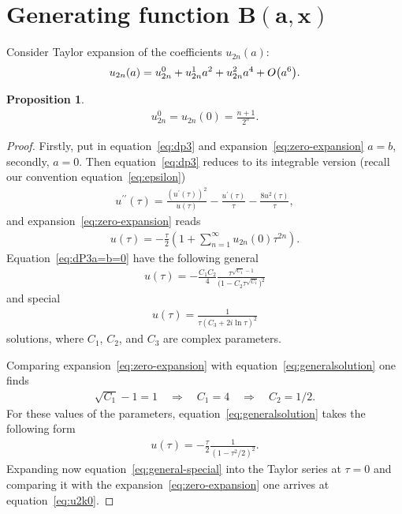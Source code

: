 \documentclass[pdftex]{sigma}
\numberwithin{equation}{section}
\newtheorem{Proposition}[Theorem]{Proposition}
 { \theoremstyle{definition}
\newtheorem{Remark}[Theorem]{Remark} }
\begin{document}
\section[Generating function $B(a,x)$]{Generating function $\boldsymbol{B(a,x)}$}\label{sec:generating-B}
Consider Taylor expansion of the coefficients $u_{2n}(a)$:
\begin{gather}\label{eq:u{2n}(a)-taylor}
u_{2n}(a)=u_{2n}^0+u_{2n}^1a^2+u_{2n}^2a^4+O\big(a^6\big).
\end{gather}
\begin{Proposition}\label{prop:u-at0}
\begin{gather}\label{eq:u2k0}
u_{2n}^0=u_{2n}(0)=\frac{n+1}{2^n}.
\end{gather}
\end{Proposition}
\begin{proof}
Firstly, put in equation~\eqref{eq:dp3} and expansion~\eqref{eq:zero-expansion} $a=b$, secondly, $a=0$.
Then equation~\eqref{eq:dp3} reduces to its integrable version (recall our convention equation~\eqref{eq:epsilon})
\begin{gather}\label{eq:dP3a=b=0}
u^{\prime \prime}(\tau) =\frac{(u^{\prime}(\tau))^{2}}{u(\tau)} - \frac{u^{\prime}(\tau)}{\tau} -\frac{8u^2(\tau)}{\tau},
\end{gather}
and expansion~\eqref{eq:zero-expansion} reads
\begin{gather}\label{eq:tracesolution}
u(\tau)=-\frac\tau2\left(1+\sum\limits_{n=1}^{\infty}u_{2n}(0)\tau^{2n}\right).
\end{gather}
Equation~\eqref{eq:dP3a=b=0} have the following general
\begin{gather}\label{eq:generalsolution}
u(\tau)=-\frac{C_1C_2}{4}\frac{\tau^{\sqrt{C_1}-1}}{\big(1-C_2\tau^{\sqrt{C_1}}\big)^2}
\end{gather}
and special
\begin{gather*}
u(\tau)=\frac{1}{\tau(C_3+2i\ln\tau)^2}
\end{gather*}
solutions, where $C_1$, $C_2$, and $C_3$ are complex parameters.

Comparing expansion~\eqref{eq:zero-expansion} with equation~\eqref{eq:generalsolution} one finds
\begin{gather*}
\sqrt{C_1}-1=1 \quad\Rightarrow\quad C_1=4 \quad\Rightarrow\quad C_2=1/2.
\end{gather*}
For these values of the parameters, equation~\eqref{eq:generalsolution} takes the following form
\begin{gather}\label{eq:general-special}
u(\tau)=-\frac{\tau}{2}\frac1{(1-\tau^2/2)^2}.
\end{gather}
Expanding now equation~\eqref{eq:general-special} into the Taylor series at $\tau=0$ and comparing it with
the expansion~\eqref{eq:zero-expansion} one arrives at equation~\eqref{eq:u2k0}.
\end{proof}
\end{document}

